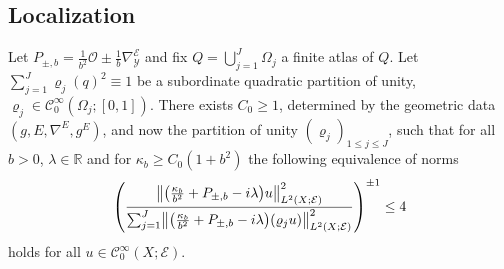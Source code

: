\documentclass[AHL,Unicode,longabstracts]{cedram}
\newcommand{\R}{\mathbb{R}}
\newcommand{\clC}{\mathcal{C}}
\newcommand{\clY}{\mathcal{Y}}
\newcommand{\clO}{\mathcal{O}}
\newcommand{\clE}{\mathcal{E}}
\newcommand\norm[1]{\left\lVert#1\right\rVert}
\let\originalleft\left
\let\originalright\right
\renewcommand{\left}{\mathopen{}\mathclose\bgroup\originalleft}
\renewcommand{\right}{\aftergroup\egroup\originalright}
\begin{document}
\subsection{Localization}\label{sec:partunitPb}
\begin{prop}\label{pr:equivalence}
Let $P_{\pm,b}=\frac{1}{b^{2}}\clO\pm\frac{1}{b}\nabla^{\clE}_{\clY}$ and fix $Q=\bigcup_{j=1}^{J}\Omega_{j}$ a finite atlas of $Q$. Let $\sum_{j=1}^{J}\varrho_{j}(q)^{2}\equiv 1$ be a subordinate quadratic partition of unity, $\varrho_{j}\in \clC^{\infty}_{0}(\Omega_{j};[0,1])$. There exists $C_{0}\geq 1$, determined by the geometric data $(g,E,\nabla^{E},g^{E})$, and now the partition of unity $(\varrho_{j})_{1\leq j\leq J}$, such that for all $b>0$, $\lambda\in \R$ and for $\kappa_{b}\geq C_{0}(1+b^{2})$ the following equivalence of norms
\begin{equation}\label{eq:equivalence}
\left(
\frac{\norm{\left(\frac{\kappa_{b}}{b^{2}}+P_{\pm,b}-i\lambda\right)u}^{2}_{L^{2}(X;\clE)}} {\sum_{j=1}^{J}\norm{\left(\frac{\kappa_{b}}{b^{2}}+P_{\pm,b}-i\lambda\right)\left(\varrho_{j}u\right)}^{2}_{L^{2}(X;\clE)}}
\right)^{\pm 1}\leq 4
\end{equation}
holds for all $ u\in \clC^{\infty}_{0}(X;\clE)$.
\end{prop}
\end{document}
